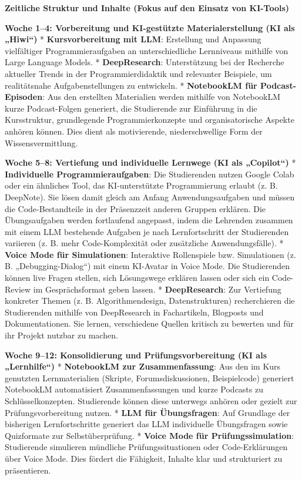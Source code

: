 \documentclass[
  ngerman,
  letterpaper,
  DIV=11]{scrreprt}
\begin{document}
\textbf{Zeitliche Struktur und Inhalte (Fokus auf den Einsatz von
KI-Tools)}

\textbf{Woche 1--4: Vorbereitung und KI-gestützte Materialerstellung (KI
als „Hiwi``)} * \textbf{Kursvorbereitung mit LLM}: Erstellung und
Anpassung vielfältiger Programmieraufgaben an unterschiedliche
Lernniveaus mithilfe von Large Language Models. * \textbf{DeepResearch}:
Unterstützung bei der Recherche aktueller Trends in der
Programmierdidaktik und relevanter Beispiele, um realitätsnahe
Aufgabenstellungen zu entwickeln. * \textbf{NotebookLM für
Podcast-Episoden}: Aus den erstellten Materialien werden mithilfe von
NotebookLM kurze Podcast-Folgen generiert, die Studierende zur
Einführung in die Kursstruktur, grundlegende Programmierkonzepte und
organisatorische Aspekte anhören können. Dies dient als motivierende,
niederschwellige Form der Wissensvermittlung.

\textbf{Woche 5--8: Vertiefung und individuelle Lernwege (KI als
„Copilot``)} * \textbf{Individuelle Programmieraufgaben}: Die
Studierenden nutzen Google Colab oder ein ähnliches Tool, das
KI-unterstützte Programmierung erlaubt (z. B. DeepNote). Sie lösen damit
gleich am Anfang Anwendungsaufgaben und müssen die Code-Bestandteile in
der Präsenzzeit anderen Gruppen erklären. Die Übungsaufgaben werden
fortlaufend angepasst, indem die Lehrenden zusammen mit einem LLM
bestehende Aufgaben je nach Lernfortschritt der Studierenden variieren
(z. B. mehr Code-Komplexität oder zusätzliche Anwendungsfälle). *
\textbf{Voice Mode für Simulationen}: Interaktive Rollenspiele bzw.
Simulationen (z. B. „Debugging-Dialog``) mit einem KI-Avatar in Voice
Mode. Die Studierenden können live Fragen stellen, sich Lösungswege
erklären lassen oder sich ein Code-Review im Gesprächsformat geben
lassen. * \textbf{DeepResearch}: Zur Vertiefung konkreter Themen (z. B.
Algorithmendesign, Datenstrukturen) recherchieren die Studierenden
mithilfe von DeepResearch in Fachartikeln, Blogposts und
Dokumentationen. Sie lernen, verschiedene Quellen kritisch zu bewerten
und für ihr Projekt nutzbar zu machen.

\textbf{Woche 9--12: Konsolidierung und Prüfungsvorbereitung (KI als
„Lernhilfe``)} * \textbf{NotebookLM zur Zusammenfassung}: Aus den im
Kurs genutzten Lernmaterialien (Skripte, Forumsdiskussionen,
Beispielcode) generiert NotebookLM automatisiert Zusammenfassungen und
kurze Podcasts zu Schlüsselkonzepten. Studierende können diese unterwegs
anhören oder gezielt zur Prüfungsvorbereitung nutzen. * \textbf{LLM für
Übungsfragen}: Auf Grundlage der bisherigen Lernfortschritte generiert
das LLM individuelle Übungsfragen sowie Quizformate zur
Selbstüberprüfung. * \textbf{Voice Mode für Prüfungssimulation}:
Studierende simulieren mündliche Prüfungssituationen oder
Code-Erklärungen über Voice Mode. Dies fördert die Fähigkeit, Inhalte
klar und strukturiert zu präsentieren.
\end{document}
